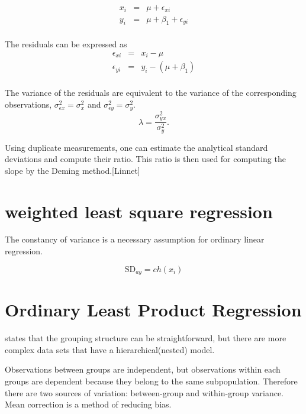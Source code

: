 \documentclass[12pt, a4paper]{report}
\theoremstyle{plain}
\theoremstyle{definition}
\theoremstyle{remark}
\begin{document}
\begin{eqnarray*}
	x_{i} &=& \mu + \epsilon_{xi}\\
	y_{i} &=& \mu +  \beta_{1} + \epsilon_{yi}\\
\end{eqnarray*}

The residuals can be expressed as
\begin{eqnarray*}
	\epsilon_{xi} &=& x_{i} - \mu  \\
	\epsilon_{yi} &=& y_{i} - (\mu + \beta_{1}) \\
\end{eqnarray*}

The variance of the residuals are equivalent to the variance of the corresponding observations, $\sigma^{2}_{\epsilon x} =
\sigma^{2}_{x}$ and $\sigma^{2}_{\epsilon y} = \sigma^{2}_{y}$.
\begin{equation}
\lambda = \frac{\sigma^{2}_{yx}}{\sigma^{2}_{y}}.
\end{equation}



Using duplicate measurements, one can estimate the analytical
standard deviations and compute their ratio. This ratio is then
used for computing the slope by the Deming method.[Linnet]



\section{weighted least square regression}
The constancy of variance is a necessary assumption for ordinary
linear regression.

\begin{equation}
	\mbox{SD}_{ay}  = ch(x_{i})
\end{equation}


\section{Ordinary Least Product Regression}
\citet{ludbrook97} states that the grouping structure can be
straightforward, but there are more complex data sets that have a hierarchical(nested) model.

Observations between groups are independent, but observations
within each groups are dependent because they belong to the same
subpopulation. Therefore there are two sources of variation:
between-group and within-group variance.
 \vspace{5 mm} \noindent Mean correction is a method of reducing
bias.
\end{document}
